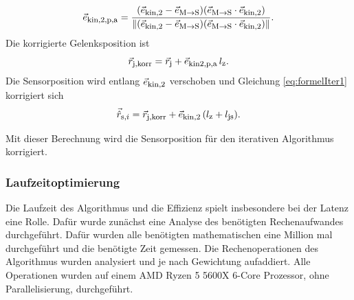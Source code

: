 \begin{equation}
    \vec{e}_{\textrm{\footnotesize{kin,2,p,a}}} = \frac{(\vec{e}_{\textrm{\footnotesize{kin,2}}} - \vec{e}_{\textrm{\footnotesize{M${\rightarrow}$S}}}) (\vec{e}_{\textrm{\footnotesize{M${\rightarrow}$S}}}\cdot \vec{e}_{\textrm{\footnotesize{kin,2}}})}{\|(\vec{e}_{\textrm{\footnotesize{kin,2}}} - \vec{e}_{\textrm{\footnotesize{M${\rightarrow}$S}}}) (\vec{e}_{\textrm{\footnotesize{M${\rightarrow}$S}}}\cdot \vec{e}_{\textrm{\footnotesize{kin,2}}})\|}.
    \label{eq:projk2toMS}
\end{equation}
Die korrigierte Gelenksposition ist  
\begin{equation}
    \vec{r}_{\textrm{\footnotesize{j,korr}}}  = \vec{r}_{\textrm{\footnotesize{j}}} + \vec{e}_{\textrm{\footnotesize{kin2,p,a}}}\,l_{\textrm{\footnotesize{z}}}.
    \label{eq:korrJointpos}
\end{equation}
Die Sensorposition wird entlang $\vec{e}_{\textrm{\footnotesize{kin,2}}}$ verschoben und Gleichung \ref{eq:formelIter1} korrigiert sich  
\begin{equation}
    \vec{\hat{r}}_{\textrm{\footnotesize{s,$i$}}} = \vec{r}_{\textrm{\footnotesize{j,korr}}} + \vec{e}_{\textrm{\footnotesize{kin,2}}} \,(l_{\textrm{\footnotesize{z}}} + l_{\textrm{\footnotesize{js}}} ).
    \label{eq:korrSensPos}
\end{equation}

Mit dieser Berechnung wird die Sensorposition für den iterativen Algorithmus korrigiert.

\subsubsection{Laufzeitoptimierung}

Die Laufzeit des Algorithmus und die Effizienz spielt insbesondere bei der Latenz eine Rolle. Dafür wurde zunächst eine Analyse des benötigten Rechenaufwandes durchgeführt. Dafür wurden alle benötigten mathematischen eine Million mal durchgeführt und die benötigte Zeit gemessen. Die Rechenoperationen des Algorithmus wurden analysiert und je nach Gewichtung aufaddiert. Alle Operationen wurden auf einem AMD Ryzen 5 5600X 6-Core Prozessor, ohne Parallelisierung, durchgeführt.

